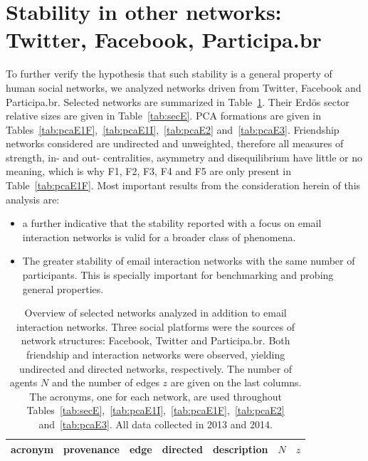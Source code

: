 \documentclass[%
 aip,
 jmp,%
 amsmath,amssymb,
 reprint,%
 floatfix,
]{revtex4-1}
\begin{document}
\section{Stability in other networks: Twitter, Facebook, Participa.br}\label{si:ext}
To further verify the hypothesis that such stability is a general property of human social networks,
we analyzed networks driven from Twitter, Facebook and Participa.br. Selected networks are summarized in
Table~\ref{tab:E}. Their Erd\"os sector relative sizes are given in Table~\ref{tab:secE}. PCA formations are given in
Tables~\ref{tab:pcaE1F},~\ref{tab:pcaE1I},~\ref{tab:pcaE2} and~\ref{tab:pcaE3}. Friendship networks considered are undirected and unweighted,
therefore all measures of strength, in- and out- centralities, asymmetry and disequilibrium have little or no meaning, which is why F1, F2, F3, F4 and F5 are only present in Table~\ref{tab:pcaE1F}.
Most important results from the consideration herein of this analysis are:

\begin{itemize}
	\item a further indicative that the stability reported with a focus on email interaction networks is valid for a broader class of phenomena.
	\item The greater stability of email interaction networks with the same number of participants. This is specially important for benchmarking and probing general properties.
\end{itemize}

\begin{table}[!h]
	\caption{Overview of selected networks analyzed in addition to email interaction networks. Three social platforms were the sources of network structures: Facebook, Twitter and Participa.br. Both friendship and interaction networks were observed, yielding undirected and directed networks, respectively. The number of agents $N$ and the number of edges $z$ are given on the last columns. The acronyms, one for each network, are used throughout Tables~\ref{tab:secE},~\ref{tab:pcaE1I},~\ref{tab:pcaE1F},~\ref{tab:pcaE2} and~\ref{tab:pcaE3}. All data collected in 2013 and 2014.}
\begin{center}
\begin{tabular}{| l | c | c | c | c | c | c | }\hline
	acronym & provenance & edge & directed & description & $N$ & $z$ \\ \hline\hline
	
\hline
\end{tabular}
\end{center}
\label{tab:E}
\end{table}
\end{document}
